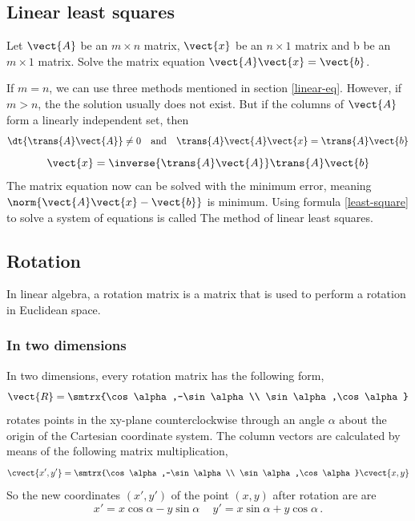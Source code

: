 \subsection{Linear least squares}
Let $\vect{A}$ be an $m\times n$ matrix, $\vect{x}$ be an $n\times 1$ matrix and b be an $m\times 1$ matrix. Solve the matrix equation $\vect{A}\vect{x}=\vect{b}$.\par 
If $m=n$, we can use three methods mentioned in section \ref{linear-eq}. However, if $m>n$, the the solution usually does not exist. But if the columns of $\vect{A}$ form a linearly independent set, then 
\begin{equation}
\dt{\trans{A}\vect{A}}\neq 0 \quad \text{and} \quad \trans{A}\vect{A}\vect{x}=\trans{A}\vect{b}
\end{equation}
\begin{equation}\label{least-square}
\vect{x}=\inverse{\trans{A}\vect{A}}\trans{A}\vect{b}
\end{equation}
The matrix equation now can be solved with the minimum error, meaning $\norm{\vect{A}\vect{x}-\vect{b}}$ is minimum. Using formula \eqref{least-square} to solve a system of equations is called The method of linear least squares.
\subsection{Rotation}
In linear algebra, a rotation matrix is a matrix that is used to perform a rotation in Euclidean space.
\subsubsection{In two dimensions}
In two dimensions, every rotation matrix has the following form,
\[ \vect{R}=\smtrx{\cos\alpha,-\sin\alpha\\ \sin\alpha,\cos\alpha} \]
rotates points in the xy-plane counterclockwise through an angle $\alpha$ about the origin of the Cartesian coordinate system. The column vectors are calculated by means of the following matrix multiplication,
\begin{equation*}
\cvect{x',y'}=\smtrx{\cos\alpha,-\sin\alpha\\ \sin\alpha,\cos\alpha}\cvect{x,y}
\end{equation*}
So the new coordinates $\left( x',y' \right)$ of the point $\left( x,y \right)$ after rotation are
are
\[
 x'=x\cos \alpha -y\sin \alpha \, \quad
 y'=x\sin \alpha +y\cos \alpha \,.
\]
